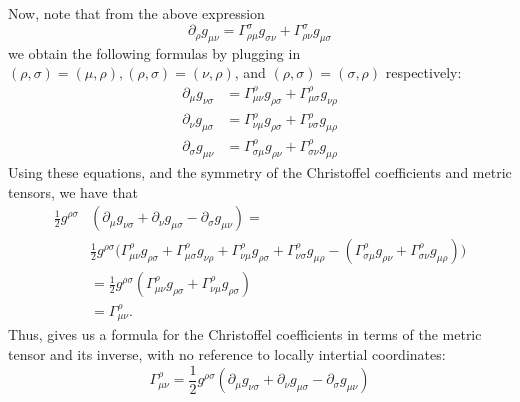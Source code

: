 \documentclass[12pt]{article}
\theoremstyle{definition}
\theoremstyle{remark}
\begin{document}
	Now, note that from the above expression 
	\[
	\partial_{ \rho } g_{ \mu \nu } = \Gamma_{ \rho \mu }^{ \sigma } g_{ \sigma \nu } + \Gamma_{ \rho \nu }^{ \sigma } g_{ \mu \sigma } 
	\]
	we obtain the following formulas by plugging in $(\rho, \sigma) = (\mu, \rho), (\rho, \sigma) = (\nu, \rho)$, and $(\rho, \sigma) = (\sigma, \rho)$ respectively:
	\begin{align*}
	\partial_{\mu} g_{ \nu \sigma } 
	&= 
	\Gamma^{\rho}_{ \mu \nu } g_{ \rho \sigma } 
	+
	\Gamma^{ \rho}_{ \mu \sigma } g_{ \nu \rho } 
	\\
	\partial_{ \nu } g_{ \mu \sigma } 
	&=
	\Gamma^{ \rho }_{ \nu \mu } g_{ \rho \sigma } 
	+
	\Gamma^{ \rho }_{ \nu \sigma } g_{ \mu \rho } 
	\\
	\partial_{ \sigma } g_{ \mu \nu } 
	&=
	\Gamma^{ \rho }_{ \sigma \mu } g_{\rho \nu } 
	+
	\Gamma^{ \rho }_{ \sigma \nu } g_{ \mu \rho } 
	\end{align*}
	Using these equations, and the symmetry of the Christoffel coefficients and metric tensors, we have that 
	\begin{align*}
	\frac{1}{2} g^{ \rho \sigma } &\left( \partial_{ \mu } g_{ \nu \sigma } + \partial_{ \nu } g_{ \mu \sigma } - \partial_{ \sigma } g_{ \mu \nu } \right) = \\
	& \frac{ 1}{2} g^{ \rho \sigma } \Big( \Gamma^{\rho}_{ \mu \nu } g_{ \rho \sigma } 
	+
	\Gamma^{ \rho}_{ \mu \sigma } g_{ \nu \rho } 
	+ 
	\Gamma^{ \rho }_{ \nu \mu } g_{ \rho \sigma } 
	+
	\Gamma^{ \rho }_{ \nu \sigma } g_{ \mu \rho } 
	-
	\left( \Gamma^{ \rho }_{ \sigma \mu } g_{\rho \nu } 
	+
	\Gamma^{ \rho }_{ \sigma \nu } g_{ \mu \rho } 
	\right) \Big) \\
	&= \frac{1}{2} g^{ \rho \sigma} \left( \Gamma^{ \rho }_{ \mu \nu } g_{ \rho \sigma } + \Gamma^{ \rho }_{ \nu \mu } g_{ \rho \sigma } \right)  \\
	&=  \Gamma^{ \rho }_{ \mu \nu }.
	\end{align*}
	Thus, gives us a formula for the Christoffel coefficients in terms of the metric tensor and its inverse, with no reference to locally intertial coordinates:
	\[
	\Gamma_{ \mu \nu }^{ \rho } = \frac{1}{2} g^{ \rho \sigma} \left( \partial_{ \mu } g_{ \nu \sigma } + \partial_{ \nu } g_{ \mu \sigma } - \partial_{ \sigma } g_{ \mu \nu } \right) 
	\]
\end{document}
